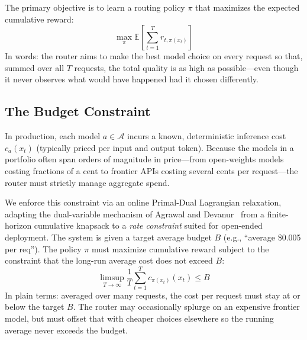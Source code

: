 The primary objective is to learn a routing policy $\pi$ that maximizes the expected cumulative reward:
\begin{equation}
    \max_{\pi} \mathbb{E} \left[ \sum_{t=1}^T r_{t,\pi(x_t)} \right]
\end{equation}
In words: the router aims to make the best model choice on every request so that, summed over all $T$ requests, the total quality is as high as possible---even though it never observes what would have happened had it chosen differently.

\subsection{The Budget Constraint}

In production, each model $a \in \mathcal{A}$ incurs a known, deterministic inference cost $c_a(x_t)$ (typically priced per input and output token). Because the models in a portfolio often span orders of magnitude in price---from open-weights models costing fractions of a cent to frontier APIs costing several cents per request---the router must strictly manage aggregate spend. 

We enforce this constraint via an online Primal-Dual Lagrangian relaxation, adapting the dual-variable mechanism of Agrawal and Devanur~\cite{agrawal2014bandits} from a finite-horizon cumulative knapsack to a \emph{rate constraint} suited for open-ended deployment. The system is given a target average budget $B$ (e.g., ``average \$0.005 per req''). The policy $\pi$ must maximize cumulative reward subject to the constraint that the long-run average cost does not exceed $B$:
\begin{equation}
    \limsup_{T \to \infty} \frac{1}{T} \sum_{t=1}^T c_{\pi(x_t)}(x_t) \leq B
\end{equation}
In plain terms: averaged over many requests, the cost per request must stay at or below the target $B$.  The router may occasionally splurge on an expensive frontier model, but must offset that with cheaper choices elsewhere so the running average never exceeds the budget.

